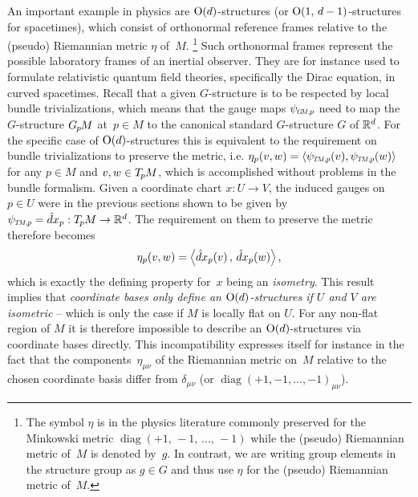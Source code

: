 An important example in physics are $\operatorname{O}(d)$-structures (or $\operatorname{O}(1,\, d-1)$-structures for spacetimes), which consist of orthonormal reference frames relative to the (pseudo) Riemannian metric $\eta$ of~$M$.%
\footnote{
    The symbol $\eta$ is in the physics literature commonly preserved for the Minkowski metric $\operatorname{diag}(+1,\, -1,\, \dots,\, -1)$ while the (pseudo) Riemannian metric of~$M$ is denoted by~$g$.
    In contrast, we are writing group elements in the structure group as $g\in G$ and thus use $\eta$ for the (pseudo) Riemannian metric of~$M$.
}
Such orthonormal frames represent the possible laboratory frames of an inertial observer.
They are for instance used to formulate relativistic quantum field theories, specifically the Dirac equation, in curved spacetimes.
Recall that a given $G$-structure is to be respected by local bundle trivializations, which means that the gauge maps $\psiGMp$ need to map the $G$-structure $G_{\mkern-1.3mu p}\mkern-1.2muM$ at~$p\in M$ to the canonical standard $G$-structure $G$ of $\mathbb{R}^d$.
For the specific case of $\operatorname{O}(d)$-structures this is equivalent to the requirement on bundle trivializations to preserve the metric, i.e. $\eta_p(v,w) = \langle \psiTMp(v), \psiTMp(w) \rangle$ for any $p\in M$ and $v,w \in T_{\mkern-1.5mu p}\mkern-.5muM$, which is accomplished without problems in the bundle formalism.
Given a coordinate chart $x: U \to V$, the induced gauges on $p\in U$ were in the previous sections shown to be given by $\psiTMp = \hat{d}x_p: \TpM \to \R^d$.
The requirement on them to preserve the metric therefore becomes
\begin{align}
    \eta_p(v,w) = \pig\langle \hat{d}x_p(v) \,,\, \hat{d}x_p(w) \pig\rangle \,,
\end{align}
which is exactly the defining property for~$x$ being an \emph{isometry}.
This result implies that \emph{coordinate bases only define an $\operatorname{O}(d)$-structures if $U$ and $V$ are isometric} -- which is only the case if $M$ is locally flat on $U$.
For any non-flat region of $M$ it is therefore impossible to describe an $\operatorname{O}(d)$-structures via coordinate bases directly.
This incompatibility expresses itself for instance in the fact that the components~$\eta_{\mu\nu}$ of the Riemannian metric on~$M$ relative to the chosen coordinate basis differ from $\delta_{\mu\nu}$ (or $\operatorname{diag}(+1,-1,\dots,-1)_{\mu\nu}$).


